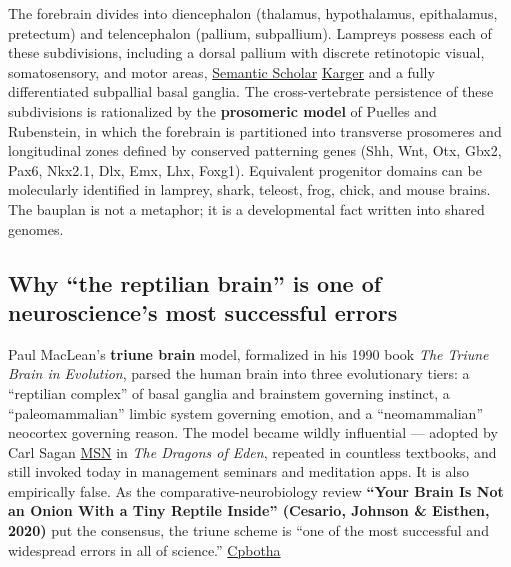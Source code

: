The forebrain divides into diencephalon (thalamus, hypothalamus, epithalamus, pretectum) and telencephalon (pallium, subpallium). Lampreys possess each of these subdivisions, including a dorsal pallium with discrete retinotopic visual, somatosensory, and motor areas, \href{https://www.semanticscholar.org/paper/The-Basal-Ganglia-Over-500-Million-Years-Grillner-Robertson/97ee475166bf993d3e74ef14e056b2aab025e04d}{Semantic Scholar} \href{https://www.karger.com/Article/FullText/517492}{Karger} and a fully differentiated subpallial basal ganglia. The cross-vertebrate persistence of these subdivisions is rationalized by the \textbf{prosomeric model} of Puelles and Rubenstein, in which the forebrain is partitioned into transverse prosomeres and longitudinal zones defined by conserved patterning genes (Shh, Wnt, Otx, Gbx2, Pax6, Nkx2.1, Dlx, Emx, Lhx, Foxg1). Equivalent progenitor domains can be molecularly identified in lamprey, shark, teleost, frog, chick, and mouse brains. The bauplan is not a metaphor; it is a developmental fact written into shared genomes.

\subsection{Why ``the reptilian brain'' is one of neuroscience's most successful errors}\label{05_vertebrates-why-the-reptilian-brain-is-one-of-neurosciences-most-successful-errors}

Paul MacLean's \textbf{triune brain} model, formalized in his 1990 book \emph{The Triune Brain in Evolution}, parsed the human brain into three evolutionary tiers: a ``reptilian complex'' of basal ganglia and brainstem governing instinct, a ``paleomammalian'' limbic system governing emotion, and a ``neomammalian'' neocortex governing reason. The model became wildly influential --- adopted by Carl Sagan \href{https://www.msn.com/en-us/news/technology/seven-and-a-half-lessons-about-the-brain-by-lisa-feldman-barrett-review/ar-BB1eca70}{MSN} in \emph{The Dragons of Eden}, repeated in countless textbooks, and still invoked today in management seminars and meditation apps. It is also empirically false. As the comparative-neurobiology review \textbf{``Your Brain Is Not an Onion With a Tiny Reptile Inside'' (Cesario, Johnson \& Eisthen, 2020)} put the consensus, the triune scheme is ``one of the most successful and widespread errors in all of science.'' \href{https://cpbotha.github.io/2021/06/05/book-notes-seven-and-a-half-lessons-about-the-brain/}{Cpbotha}

